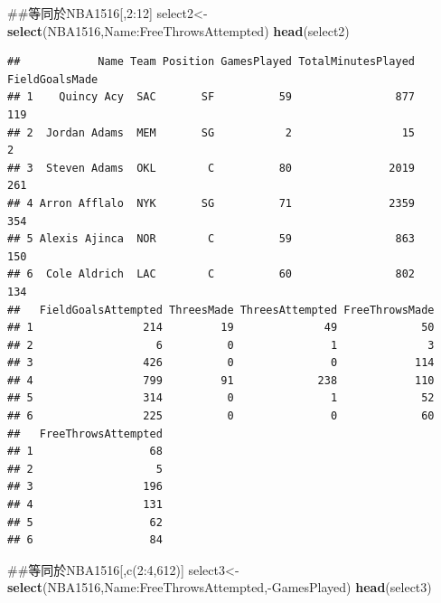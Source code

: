 \documentclass[]{book}
\newenvironment{Shaded}{\begin{snugshade}}{\end{snugshade}}
\newcommand{\KeywordTok}[1]{\textcolor[rgb]{0.13,0.29,0.53}{\textbf{{#1}}}}
\newcommand{\NormalTok}[1]{{#1}}
\theoremstyle{definition}
\theoremstyle{definition}
\theoremstyle{remark}
\begin{document}
\begin{Shaded}
\begin{Highlighting}[]
\NormalTok{##等同於NBA1516[,2:12]}
\NormalTok{select2<-}\KeywordTok{select}\NormalTok{(NBA1516,Name:FreeThrowsAttempted)}
\KeywordTok{head}\NormalTok{(select2)}
\end{Highlighting}
\end{Shaded}

\begin{verbatim}
##            Name Team Position GamesPlayed TotalMinutesPlayed FieldGoalsMade
## 1    Quincy Acy  SAC       SF          59                877            119
## 2  Jordan Adams  MEM       SG           2                 15              2
## 3  Steven Adams  OKL        C          80               2019            261
## 4 Arron Afflalo  NYK       SG          71               2359            354
## 5 Alexis Ajinca  NOR        C          59                863            150
## 6  Cole Aldrich  LAC        C          60                802            134
##   FieldGoalsAttempted ThreesMade ThreesAttempted FreeThrowsMade
## 1                 214         19              49             50
## 2                   6          0               1              3
## 3                 426          0               0            114
## 4                 799         91             238            110
## 5                 314          0               1             52
## 6                 225          0               0             60
##   FreeThrowsAttempted
## 1                  68
## 2                   5
## 3                 196
## 4                 131
## 5                  62
## 6                  84
\end{verbatim}

\begin{Shaded}
\begin{Highlighting}[]
\NormalTok{##等同於NBA1516[,c(2:4,612)]}
\NormalTok{select3<-}\KeywordTok{select}\NormalTok{(NBA1516,Name:FreeThrowsAttempted,-GamesPlayed)}
\KeywordTok{head}\NormalTok{(select3)}
\end{Highlighting}
\end{Shaded}
\end{document}
